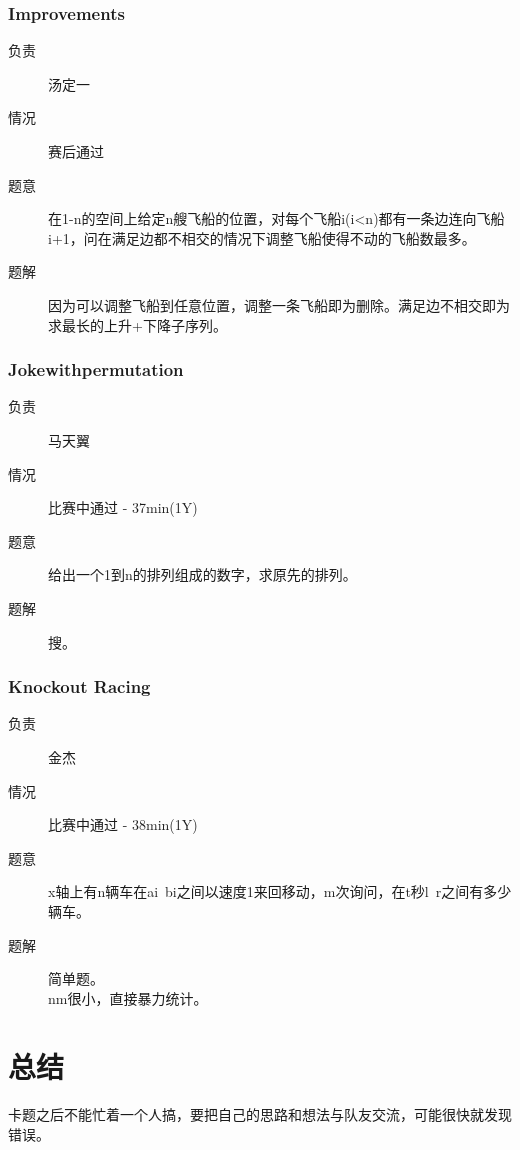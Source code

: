 \documentclass[a4paper, 11pt, nofonts, nocap, fancyhdr]{ctexart}
\newcommand{\problem}[1]{\subsubsection{#1}}
\begin{document}
\problem{Improvements}

\begin{description}
\item[负责] 汤定一
\item[情况] 赛后通过
\item[题意]
在1-n的空间上给定n艘飞船的位置，对每个飞船i(i<n)都有一条边连向飞船i+1，问在满足边都不相交的情况下调整飞船使得不动的飞船数最多。
\item[题解]
因为可以调整飞船到任意位置，调整一条飞船即为删除。满足边不相交即为求最长的上升+下降子序列。
\end{description}

\problem{Jokewithpermutation}

\begin{description}
\item[负责]马天翼
\item[情况] 比赛中通过 - 37min(1Y)
\item[题意]
给出一个1到n的排列组成的数字，求原先的排列。
\item[题解]
搜。
\end{description}

\problem{Knockout Racing}

\begin{description}
\item[负责] 金杰
\item[情况] 比赛中通过 - 38min(1Y)
\item[题意]
x轴上有n辆车在ai~bi之间以速度1来回移动，m次询问，在t秒l~r之间有多少辆车。
\item[题解]
简单题。\\
nm很小，直接暴力统计。
\end{description}

\section{总结}

卡题之后不能忙着一个人搞，要把自己的思路和想法与队友交流，可能很快就发现错误。
\end{document}
